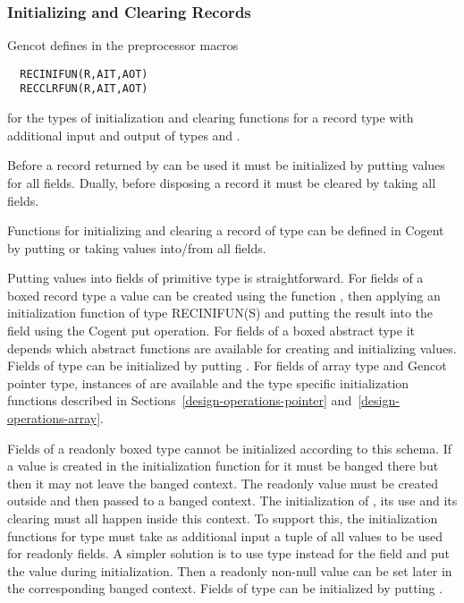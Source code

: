 \subsubsection{Initializing and Clearing Records}

Gencot defines in  the preprocessor macros
\begin{verbatim}
  RECINIFUN(R,AIT,AOT)
  RECCLRFUN(R,AIT,AOT)
\end{verbatim}
for the types of initialization and clearing functions for a record type  with additional input and output of types
 and .

Before a record returned by  can be used it must be initialized by putting values for all fields. 
Dually, before disposing a record it must be cleared by taking all fields.

Functions
for initializing and clearing a record  of type  can be defined in Cogent by putting or taking values 
into/from all fields.

Putting values into fields of primitive type is straightforward. For fields of a boxed record type  a value can be created 
using the function , then applying an initialization function of type RECINIFUN(S) and putting the result into the field using the
Cogent put operation. For fields of a boxed abstract type it depends which abstract functions are available for creating and 
initializing values. Fields of type  can be initialized by putting . For fields of array type and Gencot
pointer type, instances of  are available and the type specific initialization functions described in 
Sections~\ref{design-operations-pointer} and~\ref{design-operations-array}.

Fields of a readonly boxed type  cannot be initialized according to this schema. If a value is created in the 
initialization function for  it must be banged there but then it may not leave the banged context. The readonly value must be created
outside and then passed to a banged context. The initialization of , its use and its clearing must all happen inside
this context. To support this, the initialization functions for type  must take as additional input a tuple of all
values to be used for readonly fields. A simpler solution is to use type  instead for the field and 
put the value  during initialization. Then a readonly non-null value can be set later in the corresponding
banged context. Fields of type  can be initialized by putting .

